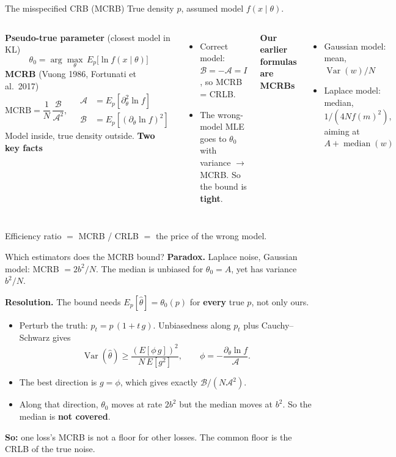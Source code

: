 \documentclass[aspectratio=169, 11pt]{beamer}
\begin{document}
\begin{frame}{The misspecified CRB (MCRB)}
  True density $p$, assumed model $f(x \mid \theta)$.
  \begin{columns}[T]
    \textbf{Pseudo-true parameter} (closest model in KL)
    \[
      \theta_0 = \arg\max_\theta\, E_p\big[\ln f(x\mid\theta)\big]
    \]
    \textbf{MCRB} (Vuong 1986, Fortunati et al.\ 2017)
    \[
      \text{MCRB} = \frac{1}{N}\,\frac{\mathcal B}{\mathcal A^2}, \quad
      \begin{aligned}
        \mathcal A &= E_p[\partial_\theta^2 \ln f]\\
        \mathcal B &= E_p[(\partial_\theta \ln f)^2]
      \end{aligned}
    \]
    Model inside, true density outside.
    \textbf{Two key facts}
    \begin{itemize}
      \item Correct model: $\mathcal B = -\mathcal A = I$, so MCRB = CRLB.
      \item The wrong-model MLE goes to $\theta_0$ with variance $\to$ MCRB. So the bound is \textbf{tight}.
    \end{itemize}
    \textbf{Our earlier formulas are MCRBs}
    \begin{itemize}
      \item Gaussian model: mean, $\operatorname{Var}(w)/N$
      \item Laplace model: median, $1/(4N f(m)^2)$, aiming at $A + \operatorname{median}(w)$
    \end{itemize}
  \end{columns}
  \vspace{0.4em}
  \centering Efficiency ratio $=$ MCRB / CRLB $=$ the price of the wrong model.
\end{frame}

\begin{frame}{Which estimators does the MCRB bound?}
  \textbf{Paradox.} Laplace noise, Gaussian model: MCRB $= 2b^2/N$. The median is unbiased for $\theta_0 = A$, yet has variance $b^2/N$.

  \vspace{0.5em}
  \textbf{Resolution.} The bound needs $E_p[\hat\theta] = \theta_0(p)$ for \textbf{every} true $p$, not only ours.
  \begin{itemize}
    \item Perturb the truth: $p_t = p\,(1 + t\,g)$. Unbiasedness along $p_t$ plus Cauchy--Schwarz gives
    \[
      \operatorname{Var}(\hat\theta) \geq \frac{(E[\phi\, g])^2}{N\,E[g^2]}, \qquad \phi = -\frac{\partial_\theta \ln f}{\mathcal A}.
    \]
    \item The best direction is $g = \phi$, which gives exactly $\mathcal B/(N\mathcal A^2)$.
    \item Along that direction, $\theta_0$ moves at rate $2b^2$ but the median moves at $b^2$. So the median is \textbf{not covered}.
  \end{itemize}
  \vspace{0.3em}
  \textbf{So:} one loss's MCRB is not a floor for other losses. The common floor is the CRLB of the true noise.
\end{frame}
\end{document}

